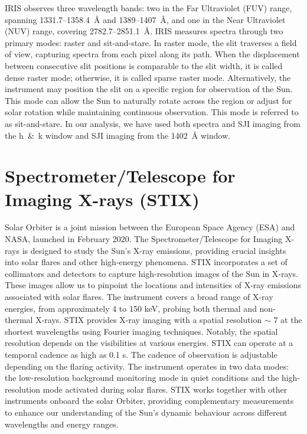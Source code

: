 IRIS observes three wavelength bands: two in the Far Ultraviolet (FUV) range, spanning 1331.7{--}1358.4~{\AA} and 1389{--}1407~{\AA}, and one in the Near Ultraviolet (NUV) range, covering 2782.7{--}2851.1~{\AA}. IRIS measures spectra through two primary modes: raster and sit-and-stare. In raster mode, the slit traverses a field of view, capturing spectra from each pixel along its path. When the displacement between consecutive slit positions is comparable to the slit width, it is called dense raster mode; otherwise, it is called sparse raster mode. Alternatively, the instrument may position the slit on a specific region for observation of the Sun. This mode can allow the Sun to naturally rotate across the region or adjust for solar rotation while maintaining continuous observation. This mode is referred to as sit-and-stare. In our analysis, we have used both spectra and SJI imaging from the  h~\&~k window and SJI imaging from the  1402~{\AA} window.

\section{Spectrometer/Telescope for Imaging X-rays (STIX)}

Solar Orbiter \citep[SO;][]{so} is a joint mission between the European Space Agency (ESA) and NASA, launched in February 2020. The Spectrometer/Telescope for Imaging X-rays \citep[STIX,][]{stix,stix1} is designed to study the Sun's X-ray emissions, providing crucial insights into solar flares and other high-energy phenomena. STIX incorporates a set of collimators and detectors to capture high-resolution images of the Sun in X-rays. These images allow us to pinpoint the locations and intensities of X-ray emissions associated with solar flares. The instrument covers a broad range of X-ray energies, from approximately 4 to 150 keV, probing both thermal and non-thermal X-rays. STIX provides X-ray imaging with a spatial resolution $\sim$ 7{\arcsec} at the shortest wavelengths using Fourier imaging techniques. Notably, the spatial resolution depends on the visibilities at various energies. STIX can operate at a temporal cadence as high as 0.1 s. The cadence of observation is adjustable depending on the flaring activity. The instrument operates in two data modes: the low-resolution background monitoring mode in quiet conditions and the high-resolution mode activated during solar flares. STIX works together with other instruments onboard the solar Orbiter, providing complementary measurements to enhance our understanding of the Sun's dynamic behaviour across different wavelengths and energy ranges.

